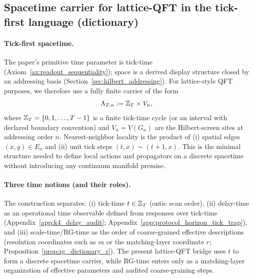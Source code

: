 \subsection{Spacetime carrier for lattice-QFT in the tick-first language (dictionary)}
\label{subsec:lattice_qft_spacetime_dictionary}

\paragraph{Tick-first spacetime.}
\InterfaceTag The paper's primitive time parameter is tick-time (Axiom~\ref{ax:readout_sequentiality}); space is a derived display structure closed by an addressing basis (Section~\ref{sec:hilbert_addressing}).
For lattice-style QFT purposes, we therefore use a fully finite carrier of the form
\[
\Lambda_{T,n}:=\mathbb{Z}_T\times V_n,
\]
where $\mathbb{Z}_T=\{0,1,\dots,T-1\}$ is a finite tick-time cycle (or an interval with declared boundary convention) and $V_n=V(G_n)$ are the Hilbert-screen sites at addressing order $n$.
Nearest-neighbor locality is the product of (i) spatial edges $(x,y)\in E_n$ and (ii) unit tick steps $(t,x)\sim(t+1,x)$.
This is the minimal structure needed to define local actions and propagators on a discrete spacetime without introducing any continuum manifold premise.

\paragraph{Three time notions (and their roles).}
\AuditTag The construction separates:
(i) tick-time $t\in\mathbb{Z}_T$ (ontic scan order),
(ii) delay-time as an operational time observable defined from responses over tick-time (Appendix~\ref{app:k4_delay_audit}; Appendix~\ref{app:protocol_horizon_tick_trap}), and
(iii) scale-time/RG-time as the order of coarse-grained effective descriptions (resolution coordinates such as $m$ or the matching-layer coordinate $r$; Proposition~\ref{prop:rg_dictionary_r}).
The present lattice-QFT bridge uses $t$ to form a discrete spacetime carrier, while RG-time enters only as a matching-layer organization of effective parameters and audited coarse-graining steps.

